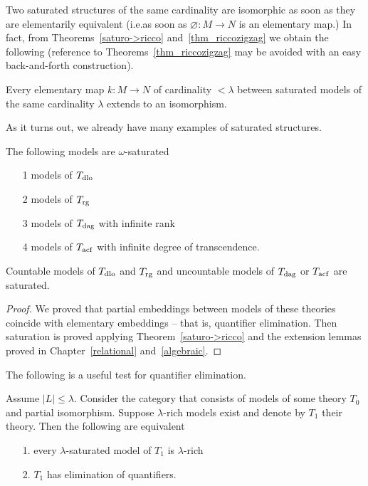 Two saturated structures of the same cardinality are isomorphic as soon as they are elementarily equivalent (i.e.\@ as soon as $\varnothing:M\to N$ is an elementary map.) In fact, from Theorems~\ref{saturo->ricco} and~\ref{thm_riccozigzag} we obtain the following (reference to Theorems~\ref{thm_riccozigzag} may be avoided with an easy back-and-forth construction).

\begin{corollary}
Every elementary map $k:M\to N$ of cardinality $<\lambda$ between saturated models of the same cardinality $\lambda$ extends to an isomorphism.
\end{corollary}

As it turns out, we already have many examples of saturated structures.

\begin{corollary}
The following models are $\omega\mbox{-}$saturated
\begin{itemize}
\item[1] models of $T_{\rm dlo}$
\item[2] models of $T_{\rm rg}$
\item[3] models of $T_{\rm dag}$ with infinite rank
\item[4] models of $T_{\rm acf}$ with infinite degree of transcendence.
\end{itemize}
Countable models of $T_{\rm dlo}$ and $T_{\rm rg}$ and uncountable models of $T_{\rm dag}$ or $T_{\rm acf}$ are saturated. 
\end{corollary}
\begin{proof}
We proved that partial embeddings between models of these theories coincide with elementary embeddings -- that is, quantifier elimination.
Then saturation is proved applying Theorem~\ref{saturo->ricco} and the extension lemmas proved in Chapter~\ref{relational} and~\ref{algebraic}.
\end{proof}

The following is a useful test for quantifier elimination.

\begin{theorem}\label{thm_ricchezza_saturazione_QE}
Assume $|L|\le\lambda$. Consider the category that consists of models of some theory $T_0$ and partial isomorphism. Suppose $\lambda\mbox{-}$rich models exist and denote by $T_1$ their theory. Then the following are equivalent
\begin{itemize}
\item[1.] every $\lambda\mbox{-}$saturated model of $T_1$ is $\lambda\mbox{-}$rich
\item[2.] $T_1$ has elimination of quantifiers.
\end{itemize}
\end{theorem}

